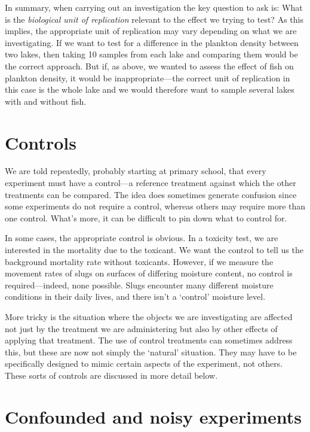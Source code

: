 \documentclass[
]{book}
\begin{document}
In summary, when carrying out an investigation the key question to ask is: What is the \emph{biological unit of replication} relevant to the effect we trying to test? As this implies, the appropriate unit of replication may vary depending on what we are investigating. If we want to test for a difference in the plankton density between two lakes, then taking 10 samples from each lake and comparing them would be the correct approach. But if, as above, we wanted to assess the effect of fish on plankton density, it would be inappropriate---the correct unit of replication in this case is the whole lake and we would therefore want to sample several lakes with and without fish.

\hypertarget{controls}{%
\section{Controls}\label{controls}}

We are told repeatedly, probably starting at primary school, that every experiment must have a control---a reference treatment against which the other treatments can be compared. The idea does sometimes generate confusion since some experiments do not require a control, whereas others may require more than one control. What's more, it can be difficult to pin down what to control for.

In some cases, the appropriate control is obvious. In a toxicity test, we are interested in the mortality due to the toxicant. We want the control to tell us the background mortality rate without toxicants. However, if we measure the movement rates of slugs on surfaces of differing moisture content, no control is required---indeed, none possible. Slugs encounter many different moisture conditions in their daily lives, and there isn't a `control' moisture level.

More tricky is the situation where the objects we are investigating are affected not just by the treatment we are administering but also by other effects of applying that treatment. The use of control treatments can sometimes address this, but these are now not simply the `natural' situation. They may have to be specifically designed to mimic certain aspects of the experiment, not others. These sorts of controls are discussed in more detail below.

\hypertarget{confounded-and-noisy-experiments}{%
\section{Confounded and noisy experiments}\label{confounded-and-noisy-experiments}}
\end{document}
